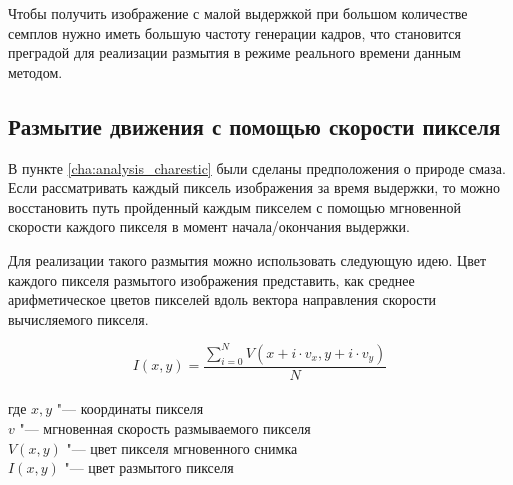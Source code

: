 Чтобы получить изображение с малой выдержкой при большом количестве семплов нужно иметь большую частоту генерации кадров, что становится преградой для реализации размытия в режиме реального времени данным методом.

\subsection{Размытие движения с помощью скорости пикселя}
\label{cha:analysis_pixelblur}


В пункте \ref{cha:analysis_charestic} были сделаны предположения о природе смаза. Если рассматривать каждый пиксель изображения за время выдержки, то можно восстановить путь пройденный каждым пикселем с помощью мгновенной скорости каждого пикселя в момент начала/окончания выдержки.
\par
Для реализации такого размытия можно использовать следующую идею. Цвет каждого пикселя размытого изображения представить, как среднее арифметическое цветов пикселей вдоль вектора направления скорости вычисляемого пикселя. \cite{GpuGems2008}
\par

\begin{eqndesc}
    \begin{equation}\label{F:F2_2_1}
        I(x,y) = \frac{\sum_{i=0}^{N} {V(x + i \cdot v_x, y + i \cdot v_y)}}{N}
    \end{equation}
    \\
    где $x,y$ "--- координаты пикселя \\
    $v$ "--- мгновенная скорость размываемого пикселя  \\
    $V(x,y)$ "--- цвет пикселя мгновенного снимка \\
    $I(x,y)$ "--- цвет размытого пикселя
\end{eqndesc}




